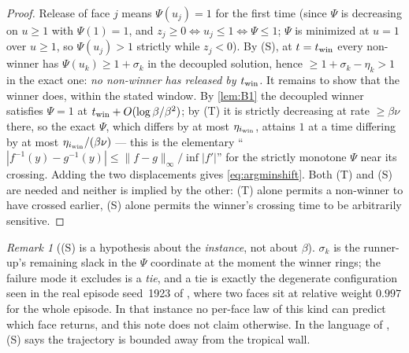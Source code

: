 \documentclass[11pt]{article}
\theoremstyle{remark}
\newtheorem{remark}[theorem]{Remark}
\begin{document}
\begin{proof}
Release of face $j$ means $\Psi(u_j)=1$ for the first time (since $\Psi$ is
decreasing on $u\ge1$ with $\Psi(1)=1$, and $z_j\ge0\iff u_j\le1\iff\Psi\le1$;
$\Psi$ is minimized at $u=1$ over $u\ge1$, so $\Psi(u_j)>1$ strictly while
$z_j<0$). By (S), at $t=t_{\rm win}$ every non-winner has
$\Psi(u_k)\ge1+\sigma_k$ in the decoupled solution, hence
$\ge1+\sigma_k-\eta_k>1$ in the exact one: \emph{no non-winner has released by
$t_{\rm win}$.} It remains to show that the winner does, within the stated
window. By \cref{lem:B1} the decoupled winner satisfies $\Psi=1$ at
$t_{\rm win}+O(\log\beta/\beta^2)$; by (T) it is strictly decreasing at rate
$\ge\beta\nu$ there, so the exact $\Psi$, which differs by at most
$\eta_{i_{\rm win}}$, attains $1$ at a time differing by at most
$\eta_{i_{\rm win}}/(\beta\nu)$ --- this is the elementary
``$|f^{-1}(y)-g^{-1}(y)|\le\|f-g\|_\infty/\inf|f'|$'' for the strictly monotone
$\Psi$ near its crossing. Adding the two displacements gives
\eqref{eq:argminshift}. Both (T) and (S) are needed and neither is implied by
the other: (T) alone permits a non-winner to have crossed earlier, (S) alone
permits the winner's crossing time to be arbitrarily sensitive.
\end{proof}

\begin{remark}[(S) is a hypothesis about the \emph{instance}, not about $\beta$]
$\sigma_k$ is the runner-up's remaining slack in the $\Psi$ coordinate at the
moment the winner rings; the failure mode it excludes is a \emph{tie}, and a tie
is exactly the degenerate configuration seen in the real episode seed~1923 of
\cite[\S3.2]{scoping}, where two faces sit at relative weight $0.997$ for the
whole episode. In that instance no per-face law of this kind can predict which
face returns, and this note does not claim otherwise. In the language of
\cite{scoping}, (S) says the trajectory is bounded away from the tropical wall.
\end{remark}
\end{document}
